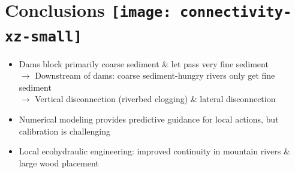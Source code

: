 \section*{Conclusions {\texttt{[image: connectivity-xz-small]}}}

{
%
\begin{frame}[plain]{}{\secname}
	\vspace{2.cm}
		\begin{tcolorbox}[colbacktitle=hellblau!80!black, colback=hellblau!10!white, fonttitle=\bfseries, standard jigsaw,colframe=blue_light, bottom=0mm, middle=0mm, boxsep=0.2mm, opacityframe=0.5, opacityfill=0.75, opacitybacktitle=0.75, title filled, title={\faGraduationCap\ Wrap-up (Conclusions)}, size=fbox]
			\vspace{0.25cm}
			\begin{itemize}			
				\item[\faChainBroken] Dams block primarily coarse sediment \& let pass very fine sediment\\
				$\rightarrow$ Downstream of dams: coarse sediment-hungry rivers only get fine sediment\\
				$\rightarrow$ Vertical disconnection (riverbed clogging) \& lateral disconnection \vspace{0.1cm}
				\item[\faLightbulbO] Numerical modeling provides predictive guidance for local actions, but calibration is challenging
				\item[\faLightbulbO] Local ecohydraulic engineering: improved continuity in mountain rivers \& large wood placement
			\end{itemize}
			\vspace{0.1cm}
		\end{tcolorbox}
		\smallskip
\end{frame}
}

